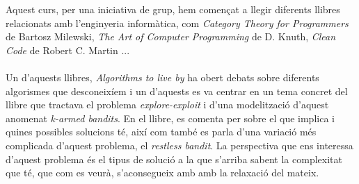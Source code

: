 
		Aquest curs, per una iniciativa de grup, hem començat a llegir diferents llibres relacionats amb l'enginyeria informàtica, com 
		\textit{Category Theory for Programmers} de Bartosz Milewski, \textit{The Art of Computer Programming}  de D. Knuth, 
		\textit{Clean Code} de Robert C. Martin \cite{catteo,knuth,clean}...\\
		\\
		Un d'aquests llibres, \textit{Algorithms to live by} \cite{alg2liveby}
		ha obert debats sobre diferents algorismes que desconeixíem i un d'aquests es va centrar en un tema concret del llibre que tractava el problema \textit{explore-exploit} i d'una modelització d'aquest anomenat \textit{k-armed bandits}. En el llibre, es comenta per sobre el que implica i quines possibles solucions té, així com també es parla d'una variació més complicada d'aquest problema, el  \textit{restless bandit}. La perspectiva que ens interessa d'aquest problema és el tipus de solució a la que s'arriba sabent la complexitat que té, que com es veurà, s'aconsegueix amb amb la relaxació del mateix.  %
